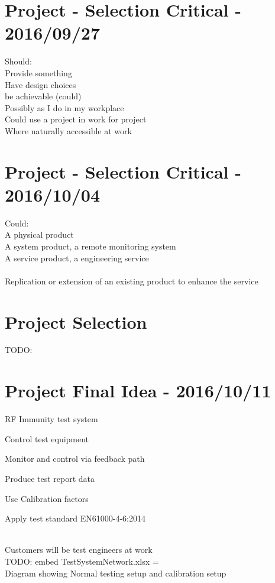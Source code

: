 \section{Project - Selection Critical - 2016/09/27}
Should:\\
Provide something\\
Have design choices\\
be achievable (could)\\
Possibly as I do in my workplace\\
Could use a project in work for project\\
 Where naturally accessible at work\\

\section{Project - Selection Critical - 2016/10/04}
Could:\\
A physical product\\
A system product, a remote monitoring system\\
A service product, a engineering service\\
\\
Replication or extension of an existing product to enhance the service\\

\section{Project Selection}
TODO:\\

\newpage

\section{Project Final Idea - 2016/10/11}
RF Immunity test system\\
\begin{itemize*}
  \item Control test equipment
  \item Monitor and control via feedback path
  \item Produce test report data
  \item Use Calibration factors
  \item Apply test standard EN61000-4-6:2014
\end{itemize*}\\
Customers will be test engineers at work\\
TODO: embed TestSystemNetwork.xlsx  = \\
Diagram showing Normal testing setup and calibration setup\\


